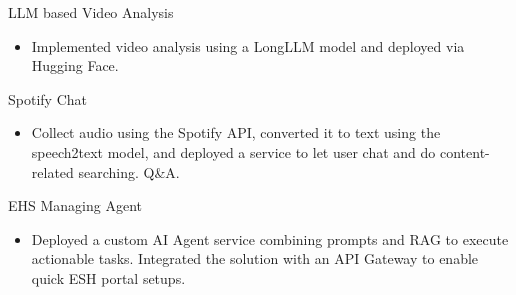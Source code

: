 

\begin{cventries}


  \cventrynotitle
  {
    \begin{cvitems} %
      \item {LLM based Video Analysis}
      \begin{itemize}
          \item {Implemented video analysis using a LongLLM model and deployed via Hugging Face.}
      \end{itemize}
      \item {Spotify Chat}
      \begin{itemize}
          \item {Collect audio using the Spotify API, converted it to text using the speech2text model, 
          and deployed a service to let user chat and do content-related searching. Q\&A.}
      \end{itemize}
      \item {EHS Managing Agent}
      \begin{itemize}
          \item {Deployed a custom AI Agent service combining prompts and RAG to execute actionable tasks. 
          Integrated the solution with an API Gateway to enable quick ESH portal setups.}
      \end{itemize}
    \end{cvitems}
  }

\end{cventries}
